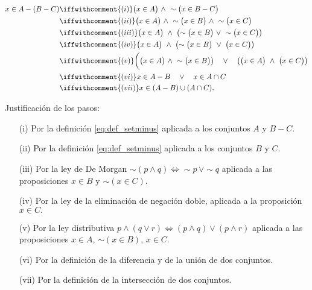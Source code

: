 \begin{enumerate}
\begin{dems}
 \begin{align*} 
x\in A - (B - C) &\iffwithcomment{(i)} \bigl(x\in A\bigr)\ \wedge\ \sim\bigl(x\in B - C\bigr) \\
&\iffwithcomment{(ii)} \bigl(x\in A\bigr)\ \wedge\ \sim\bigl(x\in B\bigr)\ \wedge\ \sim\bigl(x\in C\bigr) \\
&\iffwithcomment{(iii)} \bigl(x\in A\bigr)\ \wedge\ \bigl(\sim\bigl(x\in B\bigr)\ \vee\ \sim\bigl(x\in C\bigr)\bigr) \\
&\iffwithcomment{(iv)} \bigl(x\in A\bigr)\ \wedge\ \bigl(\sim\bigl(x\in B\bigr)\ \vee\ \bigl(x\in C\bigr)\bigr) \\
&\iffwithcomment{(v)} \biggl(\bigl(x\in A\bigr)\ \wedge\ \sim\bigl(x\in B\bigr)\bigr) \quad\vee\quad \bigl(\bigl(x\in A\bigr)\ \wedge\ \bigl(x\in C\bigr)\bigr) \\
&\iffwithcomment{(vi)} x\in A - B\quad\vee\quad x\in A\cap C \\ 
&\iffwithcomment{(vii)} x\in (A - B)\cup(A\cap C).
\end{align*} 

Justificación de los pasos: 

\begin{enumerate}

\item[(i)] Por la definición \eqref{eq:def_setminus} aplicada a
los conjuntos $A$ y $B-C$.

\item[(ii)] Por la definición \eqref{eq:def_setminus} aplicada a
los conjuntos $B$ y $C$.

\item[(iii)] Por la ley de De Morgan $\sim\left(p\wedge q\right)\Leftrightarrow\sim p\,\vee\sim q$
aplicada a las proposiciones $x\in B$ y $\sim\left(x\in C\right)$.

\item[(iv)] Por la ley de la eliminación de negación doble, aplicada
a la proposición $x\in C.$ 

\item[(v)] Por la ley distributiva $p\wedge(q\vee r)\Leftrightarrow(p\wedge q)\vee(p\wedge r)$
aplicada a las proposiciones $x\in A$, $\sim\left(x\in B\right)$,
$x\in C.$

\item[(vi)] Por la definición de la diferencia y de la unión de dos
conjuntos. 

\item[(vii)] Por la definición de la intersección de dos conjuntos. 

\end{enumerate}

\end{dems}
\end{enumerate}


